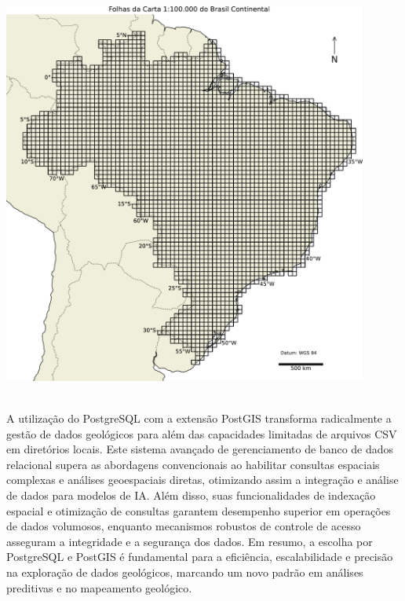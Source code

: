 {{        \centering
        \includegraphics[width=0.9\textwidth]{../images/100k_brasilcont.pdf}
        \\[5mm]
\\[10mm]
        \justifying
        \setlength{\parindent}{1.5cm} %
\par{
    A utilização do PostgreSQL com a extensão PostGIS transforma radicalmente a gestão de dados geológicos para além das capacidades limitadas de arquivos CSV em diretórios locais. Este sistema avançado de gerenciamento de banco de dados relacional supera as abordagens convencionais ao habilitar consultas espaciais complexas e análises geoespaciais diretas, otimizando assim a integração e análise de dados para modelos de IA. Além disso, suas funcionalidades de indexação espacial e otimização de consultas garantem desempenho superior em operações de dados volumosos, enquanto mecanismos robustos de controle de acesso asseguram a integridade e a segurança dos dados. Em resumo, a escolha por PostgreSQL e PostGIS é fundamental para a eficiência, escalabilidade e precisão na exploração de dados geológicos, marcando um novo padrão em análises preditivas e no mapeamento geológico.
}
    }%
}%
